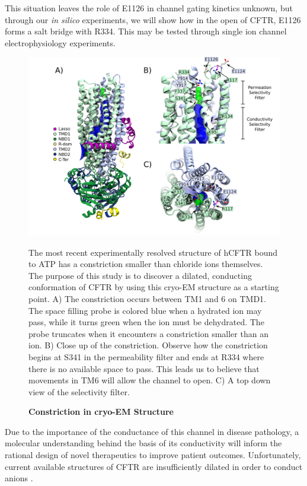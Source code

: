 This situation leaves the role of E1126 in channel gating kinetics unknown, but through our \textit{in silico} experiments, we will show how in the open of CFTR, E1126 forms a salt bridge with R334. This may be tested through single ion channel electrophysiology experiments.


\begin{figure}
	\begin{center}
		\includegraphics[width=1\textwidth]{figures/opening/overall_hole_constricted.pdf}
	\end{center}
	\captionsetup{singlelinecheck = false, justification=raggedright}
	\caption[Constriction in cryo-EM Structure] {\textbf{Constriction in cryo-EM Structure}}{The most recent experimentally resolved structure of hCFTR bound to ATP has a constriction smaller than chloride ions themselves\cite{zhang2018}. The purpose of this study is to discover a dilated, conducting conformation of CFTR by using this cryo-EM structure as a starting point. A) The constriction occurs between TM1 and 6 on TMD1. The space filling probe is colored blue when a hydrated ion may pass, while it turns green when the ion must be dehydrated. The probe truncates when it encounters a constriction smaller than an ion.  B) Close up of the constriction. Observe how the constriction begins at S341 in the permeability filter and ends at R334 where there is no available space to pass. This leads us to believe that movements in TM6 will allow the channel to open. C) A top down view of the selectivity filter.}
	\label{constricted_sel_filter}
\end{figure}

Due to the importance of the conductance of this channel in disease pathology, a molecular understanding behind the basis of its conductivity will inform the rational design of novel therapeutics to improve patient outcomes. Unfortunately, current available structures of CFTR are insufficiently dilated in order to conduct anions \cite{zhang2018}. 

